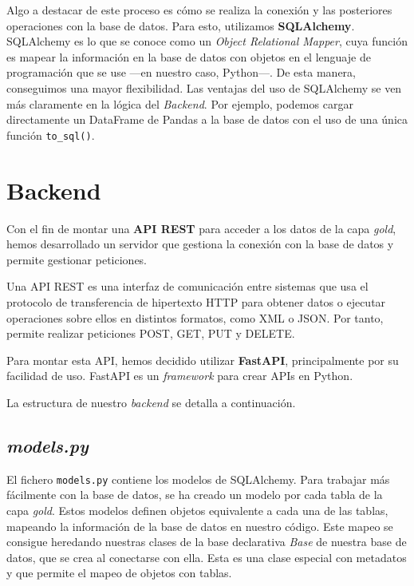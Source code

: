 \documentclass[11pt,a4paper]{article}
\begin{document}
Algo a destacar de este proceso es cómo se realiza la conexión y las posteriores operaciones con la base de datos. Para esto, utilizamos \textbf{SQLAlchemy}. SQLAlchemy es lo que se conoce como un \textit{Object Relational Mapper}, cuya función es mapear la información en la base de datos con objetos en el lenguaje de programación que se use ---en nuestro caso, Python---. De esta manera, conseguimos una mayor flexibilidad. Las ventajas del uso de SQLAlchemy se ven más claramente en la lógica del \textit{Backend}. Por ejemplo, podemos cargar directamente un DataFrame de Pandas a la base de datos con el uso de una única función \lstinline!to_sql()!.

\section{Backend}

Con el fin de montar una \textbf{API REST} para acceder a los datos de la capa \textit{gold}, hemos desarrollado un servidor que gestiona la conexión con la base de datos y permite gestionar peticiones.

Una API REST es una interfaz de comunicación entre sistemas que usa el protocolo de transferencia de hipertexto HTTP para obtener datos o ejecutar operaciones sobre ellos en distintos formatos, como XML o JSON. Por tanto, permite realizar peticiones POST, GET, PUT y DELETE.

Para montar esta API, hemos decidido utilizar \textbf{FastAPI}, principalmente por su facilidad de uso. FastAPI es un \textit{framework} para crear APIs en Python.

La estructura de nuestro \textit{backend} se detalla a continuación.

\subsection*{\textit{models.py}}

El fichero \lstinline!models.py! contiene los modelos de SQLAlchemy. Para trabajar más fácilmente con la base de datos, se ha creado un modelo por cada tabla de la capa \textit{gold}. Estos modelos definen objetos equivalente a cada una de las tablas, mapeando la información de la base de datos en nuestro código. Este mapeo se consigue heredando nuestras clases de la base declarativa \textit{Base} de nuestra base de datos, que se crea al conectarse con ella. Esta es una clase especial con metadatos y que permite el mapeo de objetos con tablas.
\end{document}
